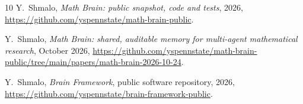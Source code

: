 \documentclass[11pt]{amsart}
\theoremstyle{remark}
\numberwithin{equation}{section}
\newcommand{\1}{\mathbf 1}
\begin{document}
\begin{thebibliography}{10}
 Y.~Shmalo, \emph{Math Brain: public snapshot, code and tests}, 2026, \url{https://github.com/yspennstate/math-brain-public}.

 Y.~Shmalo, \emph{Math Brain: shared, auditable memory for multi-agent mathematical research}, October 2026, \url{https://github.com/yspennstate/math-brain-public/tree/main/papers/math-brain-2026-10-24}.

 Y.~Shmalo, \emph{Brain Framework}, public software repository, 2026, \url{https://github.com/yspennstate/brain-framework-public}.

\end{thebibliography}
\end{document}
